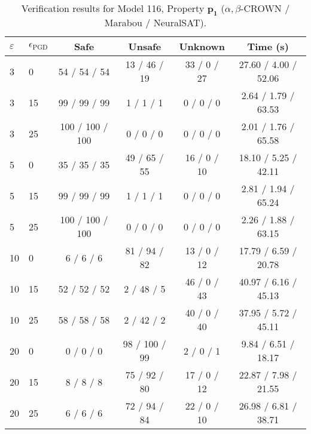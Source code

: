 \begin{table}[htbp]\centering
\caption{\small Verification results for Model 116, Property $\mathbf{p_{1}}$ ($\alpha,\beta$-CROWN / Marabou / NeuralSAT).}
\label{tab:model116_p1}
\begin{tabular}{llcccc}
\toprule
$\varepsilon$ & $\epsilon_{\scriptscriptstyle\mathrm{PGD}}$ & Safe & Unsafe & Unknown & Time (s) \\
\midrule
3 & 0 & 54 / 54 / 54 & 13 / 46 / 19 & 33 / 0 / 27 & 27.60 / 4.00 / 52.06 \\
3 & 15 & 99 / 99 / 99 & 1 / 1 / 1 & 0 / 0 / 0 & 2.64 / 1.79 / 63.53 \\
3 & 25 & 100 / 100 / 100 & 0 / 0 / 0 & 0 / 0 / 0 & 2.01 / 1.76 / 65.58 \\
5 & 0 & 35 / 35 / 35 & 49 / 65 / 55 & 16 / 0 / 10 & 18.10 / 5.25 / 42.11 \\
5 & 15 & 99 / 99 / 99 & 1 / 1 / 1 & 0 / 0 / 0 & 2.81 / 1.94 / 65.24 \\
5 & 25 & 100 / 100 / 100 & 0 / 0 / 0 & 0 / 0 / 0 & 2.26 / 1.88 / 63.15 \\
10 & 0 & 6 / 6 / 6 & 81 / 94 / 82 & 13 / 0 / 12 & 17.79 / 6.59 / 20.78 \\
10 & 15 & 52 / 52 / 52 & 2 / 48 / 5 & 46 / 0 / 43 & 40.97 / 6.16 / 45.13 \\
10 & 25 & 58 / 58 / 58 & 2 / 42 / 2 & 40 / 0 / 40 & 37.95 / 5.72 / 45.11 \\
20 & 0 & 0 / 0 / 0 & 98 / 100 / 99 & 2 / 0 / 1 & 9.84 / 6.51 / 18.17 \\
20 & 15 & 8 / 8 / 8 & 75 / 92 / 80 & 17 / 0 / 12 & 22.87 / 7.98 / 21.55 \\
20 & 25 & 6 / 6 / 6 & 72 / 94 / 84 & 22 / 0 / 10 & 26.98 / 6.81 / 38.71 \\
\bottomrule
\end{tabular}
\end{table}
